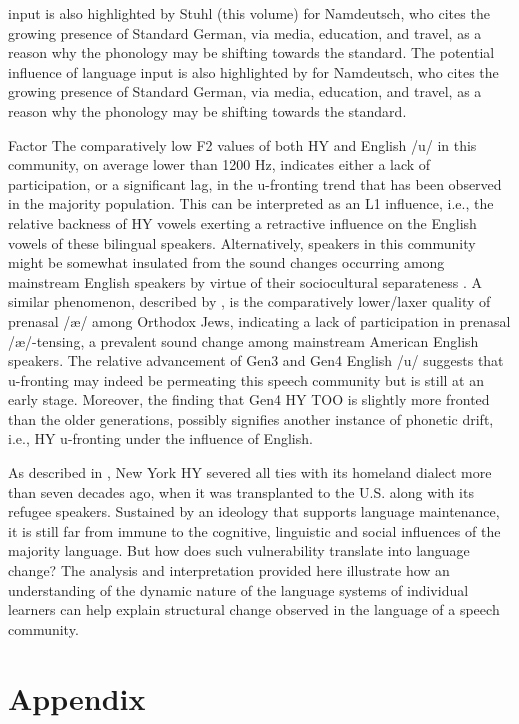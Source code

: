 \documentclass[output=paper]{langsci/langscibook}
\begin{document}
input is also highlighted by Stuhl (this volume) for Namdeutsch, who cites the growing presence of Standard German, via media, education, and travel, as a reason why the phonology may be shifting towards the standard.
The potential influence of language input is also highlighted by  for Namdeutsch, who cites the growing presence of Standard German, via media, education, and travel, as a reason why the phonology may be shifting towards the standard.

Factor The comparatively low F2 values of both HY and English /u/ in this community, on average lower than 1200 Hz, indicates either a lack of participation, or a significant lag, in the u-fronting trend that has been observed in the majority population. This can be interpreted as an L1 influence, i.e., the relative backness of HY vowels exerting a retractive influence on the English vowels of these bilingual speakers. Alternatively, speakers in this community might be somewhat insulated from the sound changes occurring among mainstream English speakers by virtue of their sociocultural separateness \citep{Fader2009}. A similar phenomenon, described by \citep{Benor2009, Benor2012}, is the comparatively lower/laxer quality of prenasal /æ/ among Orthodox Jews, indicating a lack of participation in prenasal /æ/-tensing, a prevalent sound change among mainstream American English speakers. The relative advancement of Gen3 and Gen4 English /u/ suggests that u-fronting may indeed be permeating this speech community but is still at an early stage. Moreover, the finding that Gen4 HY TOO is slightly more fronted than the older generations, possibly signifies another instance of phonetic drift, i.e., HY u-fronting under the influence of English. 

As described in , New York HY severed all ties with its homeland dialect more than seven decades ago, when it was transplanted to the U.S. along with its refugee speakers. Sustained by an ideology that supports language maintenance, it is still far from immune to the cognitive, linguistic and social influences of the majority language. But how does such vulnerability translate into language change? The analysis and interpretation provided here illustrate how an understanding of the dynamic nature of the language systems of individual learners can help explain structural change observed in the language of a speech community. 

\section*{Appendix}\label{sec:nove:appendix}
\end{document}
